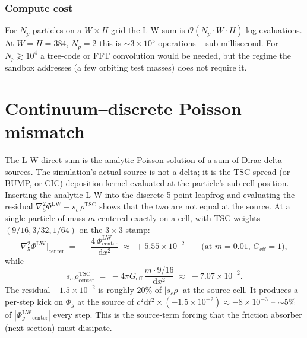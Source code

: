 \documentclass[11pt,a4paper]{article}
\newcommand{\Phig}{\Phi_g}
\newcommand{\order}[1]{\mathcal{O}(#1)}
\newcommand{\dd}{\mathrm{d}}
\begin{document}
\subsubsection*{Compute cost}

For $N_p$ particles on a $W \times H$ grid the L-W sum is
$\order{N_p \cdot W \cdot H}$ log evaluations.  At $W=H=384$, $N_p=2$
this is $\sim 3 \times 10^5$ operations -- sub-millisecond.  For
$N_p \gtrsim 10^4$ a tree-code or FFT convolution would be needed,
but the regime the sandbox addresses (a few orbiting test masses)
does not require it.

\section{Continuum--discrete Poisson mismatch}
\label{sec:lw_discrete}

The L-W direct sum is the analytic Poisson solution of a sum of Dirac
delta sources.  The simulation's actual source is not a delta; it is
the TSC-spread (or BUMP, or CIC) deposition kernel evaluated at the
particle's sub-cell position.  Inserting the analytic L-W into the
discrete 5-point leapfrog and evaluating the residual
$\nabla^2_5 \Phi^\text{LW} + s_c\,\rho^\text{TSC}$ shows that the two
are not equal at the source.  At a single particle of mass $m$
centered exactly on a cell, with TSC weights $(9/16, 3/32, 1/64)$ on
the $3 \times 3$ stamp:
\begin{equation}
  \nabla^2_5 \Phi^\text{LW}\bigr|_\text{center}
  \;=\;
  -\frac{4\,\Phi^\text{LW}_\text{center}}{\dd x^2}
  \;\approx\; +5.55 \times 10^{-2}
  \qquad\text{(at $m = 0.01$, $G_\text{eff}=1$)},
\end{equation}
while
\begin{equation}
  s_c\,\rho^\text{TSC}_\text{center}
  \;=\; -4\pi G_\text{eff}\,\frac{m \cdot 9/16}{\dd x^2}
  \;\approx\; -7.07 \times 10^{-2}.
\end{equation}
The residual $-1.5\times 10^{-2}$ is roughly $20\%$ of $|s_c\rho|$ at
the source cell.  It produces a per-step kick on $\Phig$ at the
source of $c^2\dd t^2 \times (-1.5\times 10^{-2}) \approx -8\times
10^{-3}$ -- $\sim 5\%$ of $|\Phig^\text{LW}_\text{center}|$ every
step.  This is the source-term forcing that the friction absorber
(next section) must dissipate.
\end{document}
